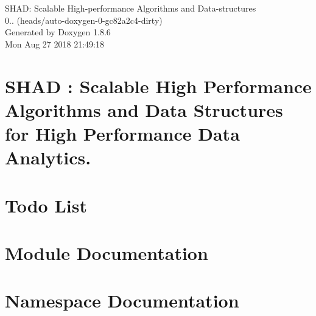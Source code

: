 \documentclass[twoside]{book}
\newcommand{\clearemptydoublepage}{%
  \newpage{\pagestyle{empty}\cleardoublepage}%
}
\begin{document}
\hypersetup{pageanchor=false}
\begin{titlepage}
\vspace*{7cm}
\begin{center}%
{\Large S\-H\-A\-D\-: Scalable High-\/performance Algorithms and Data-\/structures \\[1ex]\large 0.. (heads/auto-\/doxygen-\/0-\/gc82a2c4-\/dirty) }\\
\vspace*{1cm}
{\large Generated by Doxygen 1.8.6}\\
\vspace*{0.5cm}
{\small Mon Aug 27 2018 21:49:18}\\
\end{center}
\end{titlepage}
\clearemptydoublepage
\tableofcontents
\clearemptydoublepage
{}
\hypersetup{pageanchor=true}

\chapter{S\-H\-A\-D \-: Scalable High Performance Algorithms and Data Structures for High Performance Data Analytics.}
\label{index}\hypertarget{index}{}
\chapter{Todo List}
\label{todo}
\hypertarget{todo}{}

\chapter{Module Documentation}










\chapter{Namespace Documentation}


\end{document}
